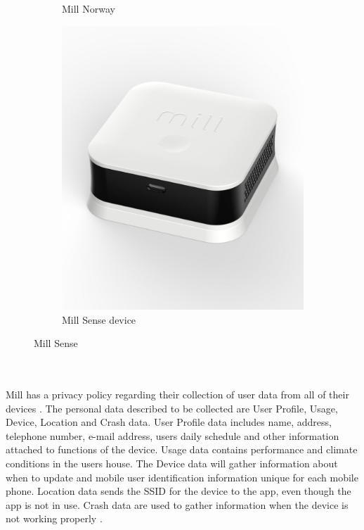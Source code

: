 \begin{figure} [!ht]
\begin{subfigure}{0.3\textwidth}
         \caption{Mill Norway \cite{MillSense}}
         \label{fig:MillSenseApp}
     \end{subfigure}
     \hspace{2cm}
      \begin{subfigure}{0.3\textwidth}
         \centering
         \includegraphics[width=1\textwidth]{figures/MillSense.jpg}
         \caption{Mill Sense device \cite{MillSense}}
         \label{fig:MillSenseDev}
     \end{subfigure}
     \hfill
        \caption{Mill Sense}
        \label{fig:MillSenseBoth}
\end{figure}
\\\\
Mill has a privacy policy regarding their collection of user data from all of their devices \cite{MillPrivacy}. The personal data described to be collected are User Profile, Usage, Device, Location and Crash data. User Profile data includes name, address, telephone number, e-mail address, users daily schedule and other information attached to functions of the device. Usage data contains performance and climate conditions in the users house. The Device data will gather information about when to update and mobile user identification information unique for each mobile phone. Location data sends the SSID for the device to the app, even though the app is not in use. Crash data are used to gather information when the device is not working properly \cite{MillPrivacy}. 
